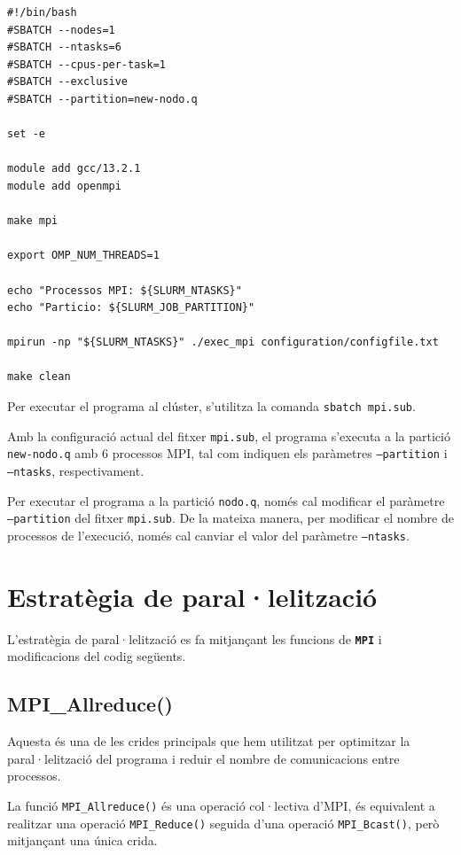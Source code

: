 \documentclass{article}
\begin{document}
\begin{verbatim}
#!/bin/bash
#SBATCH --nodes=1
#SBATCH --ntasks=6
#SBATCH --cpus-per-task=1
#SBATCH --exclusive
#SBATCH --partition=new-nodo.q

set -e

module add gcc/13.2.1
module add openmpi

make mpi

export OMP_NUM_THREADS=1

echo "Processos MPI: ${SLURM_NTASKS}"
echo "Particio: ${SLURM_JOB_PARTITION}"

mpirun -np "${SLURM_NTASKS}" ./exec_mpi configuration/configfile.txt

make clean
\end{verbatim}

Per executar el programa al clúster, s'utilitza la comanda
\texttt{sbatch mpi.sub}. 

Amb la configuració actual del
fitxer \texttt{mpi.sub}, el programa s'executa a la partició
\texttt{new-nodo.q} amb 6 processos MPI, tal com indiquen
els paràmetres \texttt{--partition} i \texttt{--ntasks},
respectivament.

Per executar el programa a la partició \texttt{nodo.q},
només cal modificar el paràmetre \texttt{--partition}
del fitxer \texttt{mpi.sub}. De la mateixa manera, per
modificar el nombre de processos de l'execució, només
cal canviar el valor del paràmetre \texttt{--ntasks}.

\newpage
\section{Estratègia de paral·lelització}

L'estratègia de paral·lelització es fa mitjançant les funcions de \texttt{\textbf{MPI}} i modificacions del codig següents.


\subsection{MPI\_Allreduce()}

Aquesta és una de les crides principals que hem utilitzat per
optimitzar la paral·lelització del programa i reduir el nombre
de comunicacions entre processos.

La funció \texttt{MPI\_Allreduce()} és una operació
col·lectiva d'MPI, és equivalent a
realitzar una operació \texttt{MPI\_Reduce()}
seguida d'una operació \texttt{MPI\_Bcast()},
però mitjançant una única crida.
\end{document}
